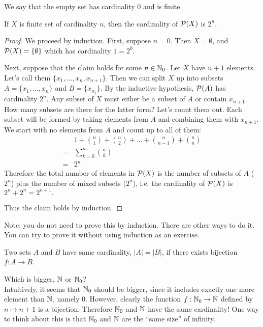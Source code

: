 \documentclass{article}
\begin{document}
We say that the empty set has cardinality 0 and is finite.

\begin{proposition}
 If $X$ is finite set of cardinality $n$, then the cardinality of $\mathcal{P}(X)$ is $2^n$.
\end{proposition}
\begin{proof}
We proceed by induction. First, suppose $n=0$. Then $X = \emptyset$, and $\mathcal{P}(X) = \{ \emptyset \}$ which has cardinality $1 = 2^0$.

Next, suppose that the claim holds for some $n \in {\mathbb{N}}_0$. Let $X$ have $n+1$ elements. Let's call them $\{x_1, \ldots, x_n, x_{n+1}\}$. Then we can split $X$ up into subsets $A=\{x_1, \ldots, x_n\}$ and $B=\{ x_{n_1}\}$. By the inductive hypothesis, $\mathcal{P}(A)$ has cardinality $2^n$. Any subset of $X$ must either be a subset of $A$ or contain $x_{n+1}$. How many subsets are there for the latter form? Let's count them out. Each subset will be formed by taking elements from $A$ and combining them with $x_{n+1}$. We start with no elements from $A$ and count up to all of them:
\begin{align*}
& 1 + \binom{n}{1} + \binom{n}{2} + \ldots + \binom{n}{n-1}  + \binom{n}{n} \\
=& \sum_{k=0}^n \binom{n}{k} \\
=& 2^n
\end{align*}
Therefore the total number of elements in $\mathcal{P}(X)$ is the number of subsets of $A$ ($2^n$) plus the number of mixed subsets ($2^n$), i.e. the cardinality of $\mathcal{P}(X)$ is $2^n+ 2^n = 2^{n+1}.$

Thus the claim holds by induction. 
\end{proof}

Note: you do not need to prove this by induction. There are other ways to do it. You can try to prove it without using induction as an exercise.

\begin{definition}
Two sets $A$ and $B$ have same cardinality, $|A| = |B|$, if there exists bijection $f:A \to B$.
\end{definition}

\begin{example}
Which is bigger, ${\mathbb{N}}$ or ${\mathbb{N}}_0$? \\
Intuitively, it seems that ${\mathbb{N}}_0$ should be bigger, since it includes exactly one more element than ${\mathbb{N}}$, namely 0. However, clearly the function $f:{\mathbb{N}}_0 \to {\mathbb{N}}$ defined by $n \mapsto n+1$ is a bijection. Therefore ${\mathbb{N}}_0$ and ${\mathbb{N}}$ have the same cardinality! One way to think about this is that ${\mathbb{N}}_0$ and ${\mathbb{N}}$ are the ``same size'' of infinity. 
\end{example}
\end{document}
